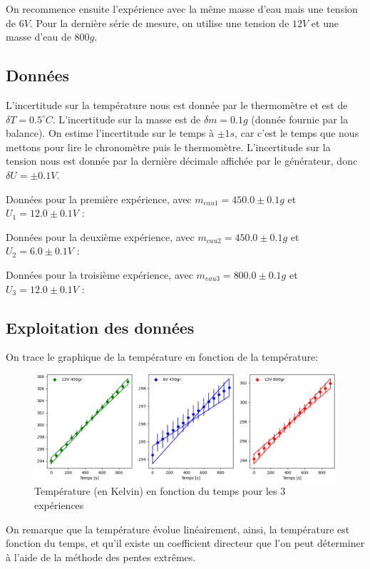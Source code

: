 \documentclass[12pt]{article}
\begin{document}
On recommence ensuite l'expérience avec la même masse d'eau mais une tension de $6V$. Pour la dernière série de mesure, on utilise une tension de $12V$ et une masse d'eau de $800g$.

\subsection{Données}

L'incertitude sur la température nous est donnée par le thermomètre et est de $\delta T = 0.5^\circ C$. 
L'incertitude sur la masse est de $\delta m = 0.1g$ (donnée fournie par la balance). 
On estime l'incertitude sur le temps à $\pm 1s$, car c'est le temps que nous mettons pour lire le chronomètre puis le thermomètre. 
L'incertitude sur la tension nous est donnée par la dernière décimale affichée par le générateur, donc $\delta U = \pm 0.1V$.

	Données pour la première expérience, avec $m_{eau1}=450.0\pm 0.1g$ et $U_1=12.0\pm 0.1V$ :


	Données pour la deuxième expérience, avec $m_{eau2}=450.0\pm 0.1g$ et $U_2=6.0\pm 0.1V$ :
	
	
	Données pour la troisième expérience, avec $m_{eau3}=800.0\pm 0.1g$ et $U_3=12.0\pm 0.1V$ :

\newpage
\subsection{Exploitation des données}

On trace le graphique de la température en fonction de la température:

\begin{figure}[h!]
	\begin{center}
		\includegraphics[scale=0.64]{img/Figure_1.png}
	\end{center}
	\label{fig:graph1}
	\caption{Température (en Kelvin) en fonction du temps pour les 3 expériences}
\end{figure}

On remarque que la température évolue linéairement, ainsi, la température est fonction du temps, et qu'il existe un coefficient directeur que l'on peut déterminer à l'aide de la méthode des pentes extrêmes.
\end{document}
